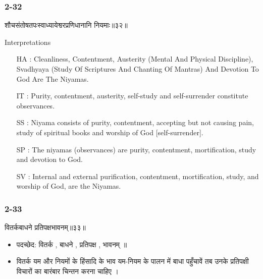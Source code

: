 \begin{frame}[fragile]\frametitle{2-32}
\begin{sanskrit}
शौचसंतोषतपःस्वाध्यायेश्वरप्रणिधानानि नियमाः॥३२॥
\end{sanskrit}

Interpretations
\begin{itemize}
\item [HA]: Cleanliness, Contentment, Austerity (Mental And Physical Discipline), Svadhyaya (Study Of Scriptures And Chanting Of Mantras) And Devotion To God Are The Niyamas.
\item [IT]: Purity, contentment, austerity, self-study and self-surrender constitute observances.
\item [SS]: Niyama consists of purity, contentment, accepting but not causing pain, study of spiritual books and worship of God [self-surrender].
\item [SP]: The niyamas (observances) are purity, contentment, mortification, study and devotion to God.
\item [SV]: Internal and external purification, contentment, mortification, study, and worship of God, are the Niyamas. 
\end{itemize}
\end{frame}

\begin{frame}[fragile]\frametitle{2-33}
\begin{sanskrit}
वितर्कबाधने प्रतिपक्षभावनम्॥३३॥
\end{sanskrit}

\begin{itemize}
\item पदच्छेद: वितर्क , बाधने , प्रतिपक्ष , भावनम् ॥
\item वितर्क यम और नियमों के हिंसादि के भाव यम-नियम के पालन में बाधा पहुँचावें तब उनके प्रतिपक्षी विचारों का बारंबार चिन्तन करना चाहिए ।
\end{itemize}	
	
\end{frame}

